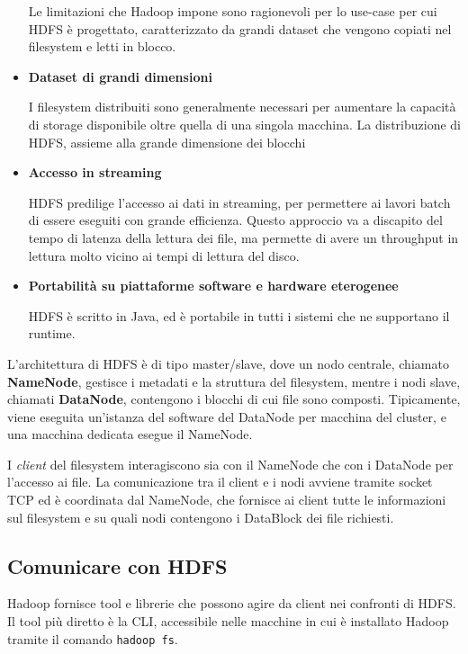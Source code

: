 \documentclass[italian,a4paper, twoside, 12pt]{report}
\begin{document}
\begin{itemize}
  Le limitazioni che Hadoop impone sono ragionevoli per lo use-case per
  cui HDFS è progettato, caratterizzato da grandi dataset che vengono
  copiati nel filesystem e letti in blocco.
\item
  \textbf{Dataset di grandi dimensioni}

  I filesystem distribuiti sono generalmente necessari per aumentare la
  capacità di storage disponibile oltre quella di una singola macchina.
  La distribuzione di HDFS, assieme alla grande dimensione dei blocchi
\item
  \textbf{Accesso in streaming}

  HDFS predilige l'accesso ai dati in streaming, per permettere ai
  lavori batch di essere eseguiti con grande efficienza. Questo
  approccio va a discapito del tempo di latenza della lettura dei file,
  ma permette di avere un throughput in lettura molto vicino ai tempi di
  lettura del disco.
\item
  \textbf{Portabilità su piattaforme software e hardware eterogenee}

  HDFS è scritto in Java, ed è portabile in tutti i sistemi che ne
  supportano il runtime.
\end{itemize}

L'architettura di HDFS è di tipo master/slave, dove un nodo centrale,
chiamato \textbf{NameNode}, gestisce i metadati e la struttura del
filesystem, mentre i nodi slave, chiamati \textbf{DataNode}, contengono
i blocchi di cui file sono composti. Tipicamente, viene eseguita
un'istanza del software del DataNode per macchina del cluster, e una
macchina dedicata esegue il NameNode.

I \emph{client} del filesystem interagiscono sia con il NameNode che con
i DataNode per l'accesso ai file. La comunicazione tra il client e i
nodi avviene tramite socket TCP ed è coordinata dal NameNode, che
fornisce ai client tutte le informazioni sul filesystem e su quali nodi
contengono i DataBlock dei file richiesti.

\subsection{Comunicare con HDFS}\label{comunicare-con-hdfs}

Hadoop fornisce tool e librerie che possono agire da client nei
confronti di HDFS. Il tool più diretto è la CLI, accessibile nelle
macchine in cui è installato Hadoop tramite il comando
\texttt{hadoop\ fs}.
\end{document}
